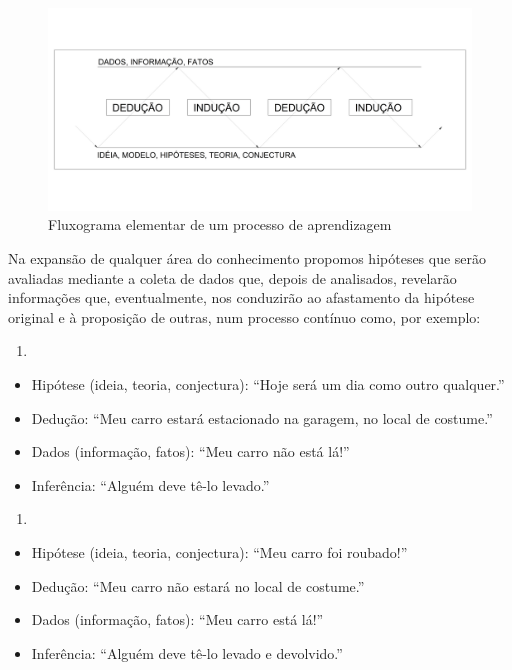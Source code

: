 \documentclass[
]{book}
\providecommand{\tightlist}{%
  \setlength{\itemsep}{0pt}\setlength{\parskip}{0pt}}
\begin{document}
\begin{figure}

{\centering \includegraphics[width=1\linewidth]{images2/flux-george} 

}

\caption{Fluxograma elementar de um processo de aprendizagem}\label{fig:unnamed-chunk-4}
\end{figure}

Na expansão de qualquer área do conhecimento propomos hipóteses que serão avaliadas mediante a coleta de dados que, depois de analisados, revelarão informações que, eventualmente, nos conduzirão ao afastamento da hipótese original e à proposição de outras, num processo contínuo como, por exemplo:

\begin{enumerate}
\def\labelenumi{(\Alph{enumi})}
\tightlist
\item
\end{enumerate}

\begin{itemize}
\tightlist
\item
  Hipótese (ideia, teoria, conjectura): ``Hoje será um dia como outro qualquer.''
\item
  Dedução: ``Meu carro estará estacionado na garagem, no local de costume.''
\item
  Dados (informação, fatos): ``Meu carro não está lá!''
\item
  Inferência: ``Alguém deve tê-lo levado.''
\end{itemize}

\begin{enumerate}
\def\labelenumi{(\Alph{enumi})}
\setcounter{enumi}{1}
\tightlist
\item
\end{enumerate}

\begin{itemize}
\tightlist
\item
  Hipótese (ideia, teoria, conjectura): ``Meu carro foi roubado!''
\item
  Dedução: ``Meu carro não estará no local de costume.''
\item
  Dados (informação, fatos): ``Meu carro está lá!''
\item
  Inferência: ``Alguém deve tê-lo levado e devolvido.''
\end{itemize}
\end{document}
